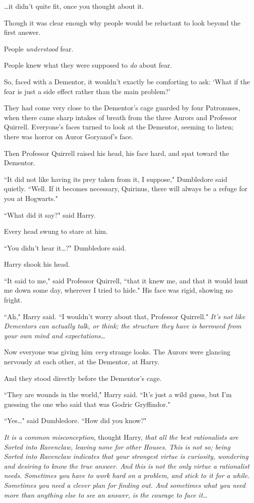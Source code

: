 {\ldots}it didn't quite fit, once you thought about it.

Though it was clear enough why people would be reluctant to look beyond the first answer.

People \emph{understood} fear.

People knew what they were supposed to \emph{do} about fear.

So, faced with a Dementor, it wouldn't exactly be comforting to ask: `What if the fear is just a side effect rather than the main problem?'

They had come very close to the Dementor's cage guarded by four Patronuses, when there came sharp intakes of breath from the three Aurors and Professor Quirrell. Everyone's faces turned to look at the Dementor, seeming to listen; there was horror on Auror Goryanof's face.

Then Professor Quirrell raised his head, his face hard, and spat toward the Dementor.

``It did not like having its prey taken from it, I suppose," Dumbledore said quietly. ``Well. If it becomes necessary, Quirinus, there will always be a refuge for you at Hogwarts."

``What did it say?" said Harry.

Every head swung to stare at him.

``You didn't hear it{\ldots}?" Dumbledore said.

Harry shook his head.

``It said to me," said Professor Quirrell, ``that it knew me, and that it would hunt me down some day, wherever I tried to hide." His face was rigid, showing no fright.

``Ah," Harry said. ``I wouldn't worry about that, Professor Quirrell." \emph{It's not like Dementors can actually talk, or think; the structure they have is borrowed from your own mind and expectations{\ldots}}

Now everyone was giving him \emph{very} strange looks. The Aurors were glancing nervously at each other, at the Dementor, at Harry.

And they stood directly before the Dementor's cage.

``They are wounds in the world," Harry said. ``It's just a wild guess, but I'm guessing the one who said that was Godric Gryffindor."

``Yes{\ldots}" said Dumbledore. ``How did you know?"

\emph{It is a common misconception}, thought Harry, \emph{that all the best rationalists are Sorted into Ravenclaw, leaving none for other Houses. This is not so; being Sorted into Ravenclaw indicates that your strongest virtue is curiosity, wondering and desiring to know the true answer. And this is not the \emph{only} virtue a rationalist needs. Sometimes you have to work hard on a problem, and stick to it for a while. Sometimes you need a clever plan for finding out. And sometimes what you need more than anything else to see an answer, is the courage to face it{\ldots}}

